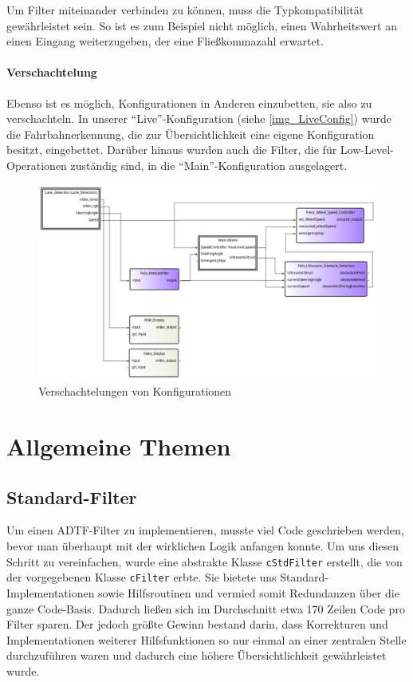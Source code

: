 \documentclass[a4paper,12pt]{report}
\begin{document}
	Um Filter miteinander verbinden zu können, muss die Typkompatibilität gewährleistet sein.
	So ist es zum Beispiel nicht möglich, einen Wahrheitswert an einen Eingang weiterzugeben, der eine Fließkommazahl erwartet.
	
\subsubsection{Verschachtelung}
	
	Ebenso ist es möglich, Konfigurationen in Anderen einzubetten, sie also zu verschachteln.
	In unserer ``Live''-Konfiguration (siehe \autoref{img_LiveConfig}) wurde die Fahrbahnerkennung, die zur Übersichtlichkeit eine eigene Konfiguration besitzt, eingebettet.
	Darüber hinaus wurden auch die Filter, die für Low-Level-Operationen zuständig sind, in die ``Main''-Konfiguration ausgelagert.
	
	\begin{figure}[ht]
		\centering
		\includegraphics[width=\textwidth, height=\textheight, keepaspectratio]{assets/LiveConfig}
		\caption{Verschachtelungen von Konfigurationen}
		\label{img_LiveConfig}
	\end{figure}

\chapter{Allgemeine Themen}
\section{Standard-Filter}

	Um einen ADTF-Filter zu implementieren, musste viel Code geschrieben werden, bevor man überhaupt mit der wirklichen Logik anfangen konnte.
	Um uns diesen Schritt zu vereinfachen, wurde eine abstrakte Klasse \texttt{cStdFilter} erstellt, die von der vorgegebenen Klasse \texttt{cFilter} erbte.
	Sie bietete uns Standard-Implementationen sowie Hilfsroutinen und vermied somit Redundanzen über die ganze Code-Basis.
	Dadurch ließen sich im Durchschnitt etwa 170 Zeilen Code pro Filter sparen.
	Der jedoch größte Gewinn bestand darin, dass Korrekturen und Implementationen weiterer Hilfsfunktionen so nur einmal an einer zentralen Stelle durchzuführen waren und dadurch eine höhere Übersichtlichkeit gewährleistet wurde.
	
\end{document}
